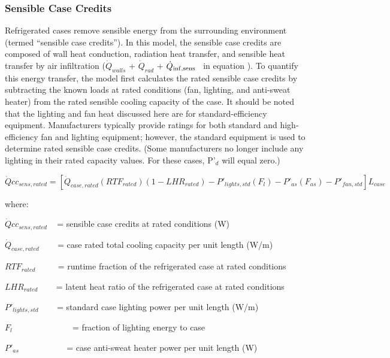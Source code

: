 \subsubsection{Sensible Case Credits}\label{sensible-case-credits}

Refrigerated cases remove sensible energy from the surrounding environment (termed ``sensible case credits''). In this model, the sensible case credits are composed of wall heat conduction, radiation heat transfer, and sensible heat transfer by air infiltration (\({\dot Q_{walls}}\) + \({\dot Q_{rad}}\) + \({\dot Q_{{\rm{inf,sens}}}}\) ~in equation ). To quantify this energy transfer, the model first calculates the rated sensible case credits by subtracting the known loads at rated conditions (fan, lighting, and anti-sweat heater) from the rated sensible cooling capacity of the case. It should be noted that the lighting and fan heat discussed here are for standard-efficiency equipment. Manufacturers typically provide ratings for both standard and high-efficiency fan and lighting equipment; however, the standard equipment is used to determine rated sensible case credits. (Some manufacturers no longer include any lighting in their rated capacity values. For these cases, P'\(_{d}\) will equal zero.)

\begin{equation}
\dot Qc{c_{sens,rated}} = \left[ {{{\dot Q}_{case,rated}}\left( {RT{F_{rated}}} \right)\left( {1 - LH{R_{rated}}} \right) - {P'}_{lights,std}\left( {{F_l}} \right) - {P'}_{as}\left( {{F_{as}}} \right) - {P'}_{fan,std}} \right]{L_{case}}
\end{equation}

where:

\(\dot Qc{c_{sens,rated}}\) ~ = sensible case credits at rated conditions (W)

\({\dot Q_{case,rated}}\) ~~~ = case rated total cooling capacity per unit length (W/m)

\(RT{F_{rated}}\) ~~~~ = runtime fraction of the refrigerated case at rated conditions

\(LH{R_{rated}}\) ~~~ = latent heat ratio of the refrigerated case at rated conditions

\({P'}_{lights,std}\) ~~~ = standard case lighting power per unit length (W/m)

\({F_l}\) ~~~~~~~~~~~~~ = fraction of lighting energy to case

\({P'}_{as}\) ~~~~~~~~~~ = case anti-sweat heater power per unit length (W)

